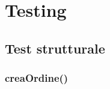\chapter{Testing}

\section{Test strutturale}

\subsection{creaOrdine()}
\inputminted [breaklines, tabsize = 4, obeytabs]{java}{chapters/testing_white_box/creaOrdine.java}